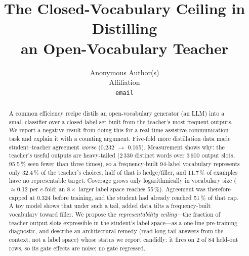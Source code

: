 \documentclass{article}
\title{The Closed-Vocabulary Ceiling in Distilling\\an Open-Vocabulary Teacher}
\author{Anonymous Author(s)\\Affiliation\\\texttt{email}}
\begin{document}
\maketitle

\begin{abstract}
A common efficiency recipe distils an open-vocabulary generator (an LLM) into
a small classifier over a closed label set built from the teacher's most
frequent outputs. We report a negative result from doing this for a real-time
assistive-communication task and explain it with a counting argument.
Five-fold more distillation data made student--teacher agreement \emph{worse}
(0.232 $\to$ 0.165). Measurement shows why: the teacher's useful outputs are
heavy-tailed (2\,330 distinct words over 3\,600 output slots, 95.5\,\% seen
fewer than three times), so a frequency-built 94-label vocabulary represents
only 32.4\,\% of the teacher's choices, half of that is hedge/filler, and
11.7\,\% of examples have no representable target. Coverage grows only
logarithmically in vocabulary size ($\approx$0.12 per $e$-fold; an $8\times$
larger label space reaches 55\,\%). Agreement was therefore capped at 0.324
before training, and the student had already reached 51\,\% of that cap. A toy
model shows that under such a tail, added data tilts a frequency-built
vocabulary toward filler. We propose the \emph{representability ceiling}---the
fraction of teacher output slots expressible in the student's label space---as
a one-line pre-training diagnostic, and describe an architectural remedy (read
long-tail answers from the context, not a label space) whose status we report
candidly: it fires on 2 of 84 held-out rows, so its gate effects are noise; no
gate regressed.
\end{abstract}

\end{document}
